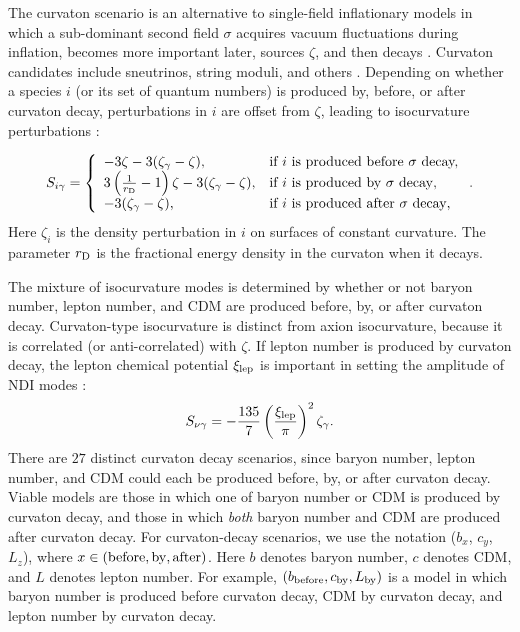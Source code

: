The curvaton scenario is an alternative to single-field inflationary models in which a sub-dominant second field $\sigma$ acquires vacuum fluctuations during inflation, becomes more important later, sources $\zeta$, and then decays \cite{Mollerach:1989hu,Mukhanov:1990me,Moroi:2001ct,Lyth:2001nq,Lyth:2002my}. Curvaton candidates include sneutrinos, string moduli, and others \cite{Postma:2002et,Kasuya:2003va,Ikegami:2004ve,Mazumdar:2004qv,Allahverdi:2006dr,Papantonopoulos:2006xi,Mazumdar:2010sa,Mazumdar:2011xe}. Depending on whether a species $i$ (or its set of quantum numbers) is produced by, before, or after curvaton decay, perturbations in $i$ are offset from $\zeta$, leading to isocurvature perturbations \cite{Lyth:2001nq,Lyth:2002my,Gordon:2002gv}:

\begin{eqnarray}
S_{i \gamma}=\left\{\begin{array}{ll}-3\zeta-3(\zeta_{\gamma}-\zeta),&\mbox{if $i$ is produced before $\sigma$ decay,}\\3\left(\frac{1}{r_{\rm D}}-1\right)\zeta-3(\zeta_{\gamma}-\zeta),&\mbox{if $i$ is produced by $\sigma$ decay},\\ -3(\zeta_\gamma-\zeta),&\mbox{if $i$ is produced after $\sigma$ decay},\end{array}\right.\label{eq:strew}.
\end{eqnarray} Here $\zeta_{i}$ is the density perturbation in $i$ on surfaces of constant curvature. The parameter $r_{\rm D}$ is the fractional energy density in the curvaton when it decays. 

The mixture of isocurvature modes is determined by whether or not baryon number, lepton number, and CDM are produced before, by, or after curvaton decay. Curvaton-type isocurvature is distinct from axion isocurvature, because it is correlated (or anti-correlated) with $\zeta$. If lepton number is produced by curvaton decay, the lepton chemical potential $\xi_{\rm lep}$ is important in setting the amplitude of NDI modes \cite{Lyth:2002my,Gordon:2003hw,DiValentino:2011sv}:
\begin{equation}
S_{\nu \gamma}=
-\frac{135}{7}\left(\frac{\xi_{\rm lep}}{\pi}\right)^2\zeta_{\gamma}.\end{equation}
There are $27$ distinct curvaton decay scenarios, since baryon number, lepton number, and CDM could each be produced before, by, or after curvaton decay. Viable models are those in which one of baryon number or CDM is produced by curvaton decay, and those in which \textit{both} baryon number and CDM are produced after curvaton decay. For curvaton-decay scenarios, we use the notation ($b_{x}$, $c_{y}$, $L_{z}$), where $x\in ({\rm before, by, after})$. Here $b$ denotes baryon number, $c$ denotes CDM, and $L$ denotes lepton number. For example, $(b_{\rm before}, c_{\rm by}, L_{\rm by})$ is a model in which baryon number is produced before curvaton decay, CDM by curvaton decay, and lepton number by curvaton decay.

